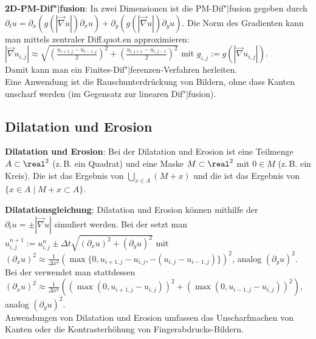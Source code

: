 \linie

\textbf{2D-PM-Dif"|fusion}:
In zwei Dimensionen ist die PM-Dif"|fusion gegeben durch\\
$\partial_t u = \partial_x (g(|\vec{\nabla} u|) \partial_x u) +
\partial_y (g(|\vec{\nabla} u|) \partial_y u)$.
Die Norm des Gradienten kann man mittels zentraler Diff.quot.en approximieren:
$|\vec{\nabla} u_{i,j}| \approx \sqrt{(\frac{u_{i+1,j} - u_{i-1,j}}{2})^2 +
(\frac{u_{i,j+1} - u_{i,j-1}}{2})^2}$ mit $g_{i,j} := g(|\vec{\nabla} u_{i,j}|)$.\\
Damit kann man ein Finites-Dif"|ferenzen-Verfahren herleiten.\\
Eine Anwendung ist die Rauschunterdrückung von Bildern, ohne dass Kanten unscharf werden
(im Gegensatz zur linearen Dif"|fusion).

\subsection{%
    Dilatation und Erosion%
}

\textbf{Dilatation und Erosion}:
Bei der Dilatation und Erosion ist eine Teilmenge $A \subset \real^2$ (z.\,B. ein Quadrat) und
eine Maske $M \subset \real^2$ mit $0 \in M$ (z.\,B. ein Kreis).
Die  ist das Ergebnis von $\bigcup_{x \in A} (M + x)$ und
die  ist das Ergebnis von $\{x \in A \;|\; M + x \subset A\}$.

\textbf{Dilatationsgleichung}:
Dilatation und Erosion können mithilfe der \\
$\partial_t u = \pm|\vec{\nabla} u|$ simuliert werden.
Bei der  setzt man\\
$u_{i,j}^{n+1} := u_{i,j}^n \pm \Delta t \sqrt{(\partial_x u)^2 + (\partial_y u)^2}$ mit
$(\partial_x u)^2 \approx
\frac{1}{\Delta x^2} (\max\{0, u_{i+1,j} - u_{i,j}, -(u_{i,j} - u_{i-1,j})\})^2$,
analog $(\partial_y u)^2$.\\
Bei der  verwendet man stattdessen\\
$(\partial_x u)^2 \approx
\frac{1}{\Delta x^2} ((\max(0, u_{i+1,j} - u_{i,j}))^2 + (\max(0, u_{i-1,j} - u_{i,j}))^2)$,
analog $(\partial_y u)^2$.\\
Anwendungen von Dilatation und Erosion umfassen das Unscharfmachen von Kanten oder
die Kontrasterhöhung von Fingerabdrucks-Bildern.

\pagebreak
